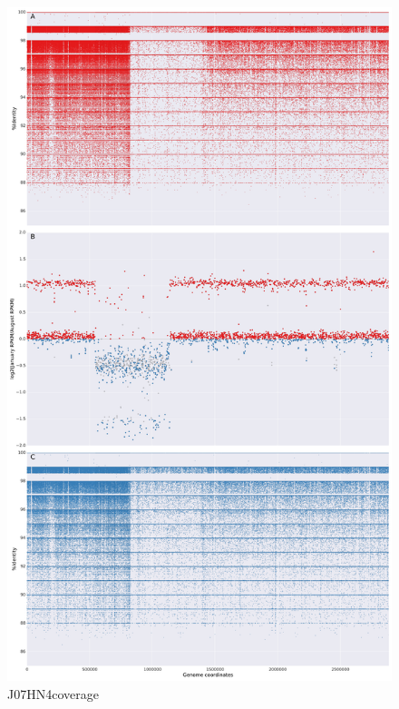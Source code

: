 \begin{figure}[!hbtp]
  \centering
  \includegraphics[width=\textwidth,height=\textheight,keepaspectratio]{Chapter5/Figures/coverage_plots/J07HN4_coverage.pdf}
  \caption{J07HN4coverage}
  \label{J07HN4coverage}
\end{figure}

